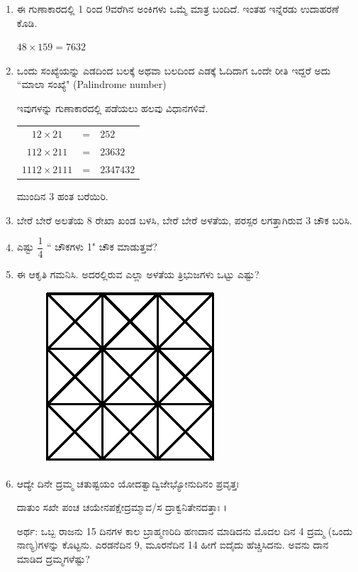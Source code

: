 \begin{enumerate}
\item ಈ ಗುಣಾಕಾರದಲ್ಲಿ 1 ರಿಂದ 9ವರೆಗಿನ ಅಂಕಿಗಳು ಒಮ್ಮೆ ಮಾತ್ರ ಬಂದಿದೆ. ಇಂತಹ ಇನ್ನೆರಡು ಉದಾಹರಣೆ ಕೊಡಿ.

$48\times 159 = 7632$

\item ಒಂದು ಸಂಖ್ಯೆಯನ್ನು ಎಡದಿಂದ ಬಲಕ್ಕೆ ಅಥವಾ ಬಲದಿಂದ ಎಡಕ್ಕೆ ಓದಿದಾಗ ಒಂದೇ ರೀತಿ ಇದ್ದರೆ ಅದು ``ಮಾಲಾ ಸಂಖ್ಯೆ" (Palindrome number)

ಇವುಗಳನ್ನು ಗುಣಾಕಾರದಲ್ಲಿ ಪಡೆಯಲು ಹಲವು ವಿಧಾನಗಳಿವೆ. 

\begin{tabular}[t]{ccl}
$12\times 21$ & = & $252$\\
$112\times 211$ & = & $23632$\\
$1112\times 2111$ & = & $2347432$
\end{tabular}

ಮುಂದಿನ 3 ಹಂತ ಬರೆಯಿರಿ. 

\item ಬೇರೆ ಬೇರೆ ಅಲತೆಯ 8 ರೇಖಾ ಖಂಡ ಬಳಸಿ, ಬೇರೆ ಬೇರೆ ಅಳತೆಯ, ಪರಸ್ಪರ ಲಗತ್ತಾಗಿರುವ 3 ಚೌಕ ಬರಿಸಿ.

\item ಎಷ್ಟು $\dfrac{1}{4}$ `` ಚೌಕಗಳು 1" ಚೌಕ ಮಾಡುತ್ತವೆ? 

\item ಈ ಆಕೃತಿ ಗಮನಿಸಿ. ಅದರಲ್ಲಿರುವ ಎಲ್ಲಾ ಅಳತೆಯ ತ್ರಿಭುಜಗಳು ಒಟ್ಟು ಎಷ್ಟು? 

\begin{figure}[H]
\centering
\includegraphics{images/chap8/q20.eps}
\end{figure}

\item ಆದ್ಯೇ ದಿನೇ ದ್ರಮ್ಮ ಚತುಷ್ಟಯಂ ಯೋದತ್ವಾದ್ವಿಜೇಭ್ಯೋನುದಿನಂ ಪ್ರವೃತ್ತಃ 

ದಾತುಂ ಸಖೇ ಪಂಚ ಚಯೇನಪಕ್ಷೇದ್ರಮ್ಮಾವ/ಸ ದ್ರಾಕ್ವನಿತೇನದತ್ತಾಃ ।

ಅರ್ಥ: ಒಬ್ಬ ರಾಜನು 15 ದಿನಗಳ ಕಾಲ ಬ್ರಾಹ್ಮಣರಿದಿ ಹಣದಾನ ಮಾಡಿದನು ಮೊದಲ ದಿನ 4 ದ್ರಮ್ಮ (ಒಂದು ನಾಣ್ಯ)ಗಳನ್ನು ಕೊಟ್ಟನು. ಎರಡನೆದಿನ 9, ಮೂರನೆದಿನ 14 ಹೀಗೆ ಐದೈದು ಹೆಚ್ಚಿಸಿದನು. ಅವನು ದಾನ ಮಾಡಿದ ದ್ರಮ್ಮಗಳೆಷ್ಟು? 


\end{enumerate}

